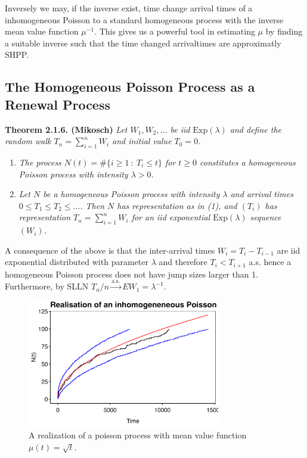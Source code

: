 \documentclass[a4paper,12pt,openany]{book}
\providecommand{\tightlist}{%
 \setlength{\itemsep}{0pt}\setlength{\parskip}{0pt}}
\begin{document}
Inversely we may, if the inverse exist, time change arrival times of a inhomogeneous Poisson to a standard homogeneous process with the inverse mean value function \(\mu^{-1}\). This gives us a powerful tool in estimating \(\mu\) by finding a suitable inverse such that the time changed arrivaltimes are approximatly SHPP.

\hypertarget{the-homogeneous-poisson-process-as-a-renewal-process}{%
\subsection{The Homogeneous Poisson Process as a Renewal Process}\label{the-homogeneous-poisson-process-as-a-renewal-process}}

\textbf{Theorem 2.1.6. (Mikosch)} \emph{Let \(W_1,W_2,...\) be iid \(\text{Exp}(\lambda)\) and define the random walk \(T_n=\sum_{i=1}^n W_i\) and initial value \(T_0=0\).}

\begin{enumerate}
\def\labelenumi{(\arabic{enumi})}
\tightlist
\item
  \emph{The process \(N(t)=\# \{i\ge 1\ :\ T_i\le t\}\) for \(t\ge 0\) constitutes a homogeneous Poisson process with intensity \(\lambda >0\).}
\item
  \emph{Let \(N\) be a homogeneous Poisson process with intensity \(\lambda\) and arrival times \(0 \le T_1 \le T_2 \le ...\). Then \(N\) has representation as in (1), and \((T_i)\) has representation \(T_n=\sum_{i=1}^n W_i\) for an iid exponential \(\text{Exp}(\lambda)\) sequence \((W_i)\).}
\end{enumerate}

A consequence of the above is that the inter-arrival times \(W_i=T_i-T_{i-1}\) are iid exponential distributed with parameter \(\lambda\) and therefore \(T_i<T_{i+1}\) a.s. hence a homogeneous Poisson process does not have jump sizes larger than 1. Furthermore, by SLLN \(T_n/n \stackrel{\text{a.s.}}{\to} E W_1=\lambda^{-1}\).

\begin{figure}[H]
  \begin{center}
    \includegraphics[width=0.75\textwidth]{figures/skade1_plot2.png}
  \end{center}
  \caption{A realization of a poisson process with mean value function $\mu(t)=\sqrt{t}$.}
\end{figure}
\end{document}

